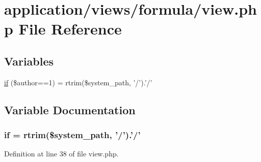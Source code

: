\hypertarget{view_8php}{\section{application/views/formula/view.php File Reference}
\label{view_8php}
}
\subsection*{Variables}
\begin{DoxyCompactItemize}
\item 
\hyperlink{view_8php_aedd748201fa69e4a7b1166124a4a76b7}{if} (\$author==1) = rtrim(\$system\-\_\-path, '/').'/'
\end{DoxyCompactItemize}


\subsection{Variable Documentation}
\hypertarget{view_8php_aedd748201fa69e4a7b1166124a4a76b7}{
\subsubsection[{if}]{\setlength{\rightskip}{0pt plus 5cm}if = rtrim(\$system\-\_\-path, '/').'/'}}\label{view_8php_aedd748201fa69e4a7b1166124a4a76b7}


Definition at line 38 of file view.\-php.

